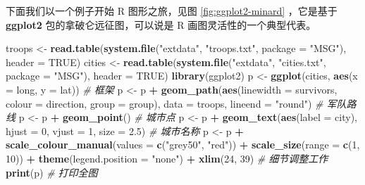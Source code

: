 \documentclass[
  b5paper,
  UTF8,twoside]{book}
\newenvironment{Shaded}{\begin{snugshade}}{\end{snugshade}}
\newcommand{\AttributeTok}[1]{\textcolor[rgb]{0.13,0.29,0.53}{#1}}
\newcommand{\CommentTok}[1]{\textcolor[rgb]{0.56,0.35,0.01}{\textit{#1}}}
\newcommand{\ConstantTok}[1]{\textcolor[rgb]{0.56,0.35,0.01}{#1}}
\newcommand{\DecValTok}[1]{\textcolor[rgb]{0.00,0.00,0.81}{#1}}
\newcommand{\FloatTok}[1]{\textcolor[rgb]{0.00,0.00,0.81}{#1}}
\newcommand{\FunctionTok}[1]{\textcolor[rgb]{0.13,0.29,0.53}{\textbf{#1}}}
\newcommand{\NormalTok}[1]{#1}
\newcommand{\OtherTok}[1]{\textcolor[rgb]{0.56,0.35,0.01}{#1}}
\newcommand{\SpecialCharTok}[1]{\textcolor[rgb]{0.81,0.36,0.00}{\textbf{#1}}}
\newcommand{\StringTok}[1]{\textcolor[rgb]{0.31,0.60,0.02}{#1}}
\newcounter{none} %
\begin{document}
下面我们以一个例子开始 R 图形之旅，见图 \ref{fig:ggplot2-minard} ，它是基于 \textbf{ggplot2} 包的拿破仑远征图，可以说是 R 画图灵活性的一个典型代表。





\begin{Shaded}
\begin{Highlighting}[]
\NormalTok{troops }\OtherTok{\textless{}{-}} \FunctionTok{read.table}\NormalTok{(}\FunctionTok{system.file}\NormalTok{(}\StringTok{"extdata"}\NormalTok{, }\StringTok{"troops.txt"}\NormalTok{, }\AttributeTok{package =} \StringTok{"MSG"}\NormalTok{), }\AttributeTok{header =} \ConstantTok{TRUE}\NormalTok{)}
\NormalTok{cities }\OtherTok{\textless{}{-}} \FunctionTok{read.table}\NormalTok{(}\FunctionTok{system.file}\NormalTok{(}\StringTok{"extdata"}\NormalTok{, }\StringTok{"cities.txt"}\NormalTok{, }\AttributeTok{package =} \StringTok{"MSG"}\NormalTok{), }\AttributeTok{header =} \ConstantTok{TRUE}\NormalTok{)}
\FunctionTok{library}\NormalTok{(ggplot2)}
\NormalTok{p }\OtherTok{\textless{}{-}} \FunctionTok{ggplot}\NormalTok{(cities, }\FunctionTok{aes}\NormalTok{(}\AttributeTok{x =}\NormalTok{ long, }\AttributeTok{y =}\NormalTok{ lat)) }\CommentTok{\# 框架}
\NormalTok{p }\OtherTok{\textless{}{-}}\NormalTok{ p }\SpecialCharTok{+} \FunctionTok{geom\_path}\NormalTok{(}\FunctionTok{aes}\NormalTok{(}\AttributeTok{linewidth =}\NormalTok{ survivors, }\AttributeTok{colour =}\NormalTok{ direction, }\AttributeTok{group =}\NormalTok{ group), }
                   \AttributeTok{data =}\NormalTok{ troops, }\AttributeTok{lineend =} \StringTok{"round"}\NormalTok{) }\CommentTok{\# 军队路线}
\NormalTok{p }\OtherTok{\textless{}{-}}\NormalTok{ p }\SpecialCharTok{+} \FunctionTok{geom\_point}\NormalTok{() }\CommentTok{\# 城市点}
\NormalTok{p }\OtherTok{\textless{}{-}}\NormalTok{ p }\SpecialCharTok{+} \FunctionTok{geom\_text}\NormalTok{(}\FunctionTok{aes}\NormalTok{(}\AttributeTok{label =}\NormalTok{ city), }\AttributeTok{hjust =} \DecValTok{0}\NormalTok{, }\AttributeTok{vjust =} \DecValTok{1}\NormalTok{, }\AttributeTok{size =} \FloatTok{2.5}\NormalTok{) }\CommentTok{\# 城市名称}
\NormalTok{p }\OtherTok{\textless{}{-}}\NormalTok{ p }\SpecialCharTok{+} \FunctionTok{scale\_colour\_manual}\NormalTok{(}\AttributeTok{values =} \FunctionTok{c}\NormalTok{(}\StringTok{"grey50"}\NormalTok{, }\StringTok{"red"}\NormalTok{)) }\SpecialCharTok{+} 
  \FunctionTok{scale\_size}\NormalTok{(}\AttributeTok{range =} \FunctionTok{c}\NormalTok{(}\DecValTok{1}\NormalTok{, }\DecValTok{10}\NormalTok{)) }\SpecialCharTok{+}
  \FunctionTok{theme}\NormalTok{(}\AttributeTok{legend.position =} \StringTok{"none"}\NormalTok{) }\SpecialCharTok{+} 
  \FunctionTok{xlim}\NormalTok{(}\DecValTok{24}\NormalTok{, }\DecValTok{39}\NormalTok{) }\CommentTok{\# 细节调整工作}
\FunctionTok{print}\NormalTok{(p) }\CommentTok{\# 打印全图}
\end{Highlighting}
\end{Shaded}
\end{document}
